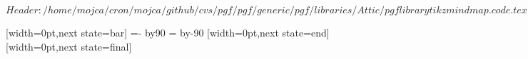 %
%
%

\ProvidesFileRCS[v\pgfversion] $Header: /home/mojca/cron/mojca/github/cvs/pgf/pgf/generic/pgf/libraries/Attic/pgflibrarytikzmindmap.code.tex,v 1.15 2006/10/16 22:32:59 tantau Exp $



%

{
  [width=0pt,next state=bar]
  {
    {
    \pgftransformxshift{-\pgfsnakecirclestartradius}%
    \pgfpathmoveto{\pgfpointpolar{\pgfsnakesegmentangle}{\pgfsnakecirclestartradius}}
    \pgfpatharc{\pgfsnakesegmentangle}{-\pgfsnakesegmentangle}{\pgfsnakecirclestartradius}
    \@tempcnta=-\pgfsnakesegmentangle\relax
    \advance\@tempcnta by90\relax
    \setlength\@tempdima{\pgfsnakecirclestartradius}
    \setlength\@tempdimb{\pgfsnakesegmentamplitude}
    \pgfpathcurveto
    {\pgfpointadd
      {\pgfpointpolar{-\pgfsnakesegmentangle}{\pgfsnakecirclestartradius}}
      {}}
    {}
    {}
    \@tempcnta=\pgfsnakesegmentangle\relax
    \advance\@tempcnta by-90\relax
    \pgfpathcurveto
    {}
    {\pgfpointadd
      {\pgfpointpolar{\pgfsnakesegmentangle}{\pgfsnakecirclestartradius}}
      {}}
    {\pgfpointpolar{\pgfsnakesegmentangle}{\pgfsnakecirclestartradius}}
    \pgfpathclose
    }
  }
  [width=0pt,next state=end]
  {
    \setlength\@tempdima{\pgfsnakecirclestartradius}%
    \setlength\@tempdimb{\pgfsnakecircleendradius}%
    \setlength\pgf@xc{\pgfsnakesegmentamplitude}%
    \pgfpathrectangle
    {}
    {}
  }
  [width=0pt,next state=final]
  {
    {
    \pgftransformxshift{\pgfsnakeremainingdistance}%
    \pgftransformxshift{-\pgfsnakecircleendradius}%
    \pgfpathmoveto{\pgfpointpolar{\pgfsnakesegmentangle}{\pgfsnakecircleendradius}}
}}}

